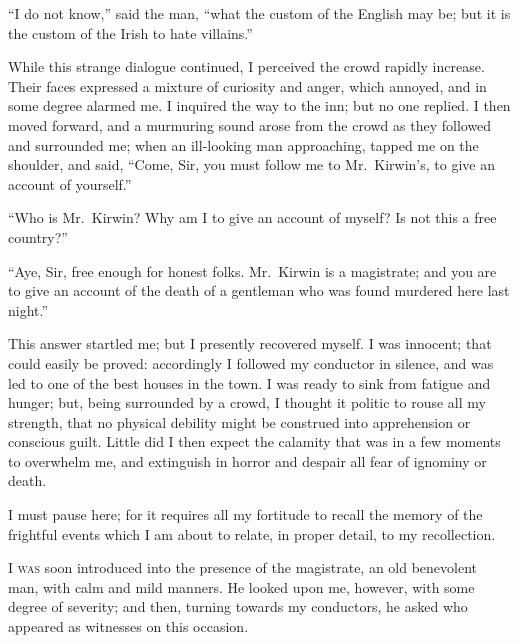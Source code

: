``I do not know,'' said the man,
``what the custom of the English may
be; but it is the custom of the Irish to
hate villains.''

While this strange dialogue continued,
I perceived the crowd rapidly
increase. Their faces expressed a mixture
of curiosity and anger, which annoyed,
and in some degree alarmed
me. I inquired the way to the inn;
but no one replied. I then moved forward,
and a murmuring sound arose
from the crowd as they followed and
surrounded me; when an ill-looking
man approaching, tapped me on the
shoulder, and said, ``Come, Sir, you
must follow me to Mr.~Kirwin's, to give
an account of yourself.''

``Who is Mr.~Kirwin? Why am I
to give an account of myself? Is not
this a free country?''

``Aye, Sir, free enough for honest
folks. Mr.~Kirwin is a magistrate;
and you are to give an account of the
death of a gentleman who was found
murdered here last night.''

This answer startled me; but I presently
recovered myself. I was innocent;
that could easily be proved: accordingly
I followed my conductor in
silence, and was led to one of the best
houses in the town. I was ready to
sink from fatigue and hunger; but,
being surrounded by a crowd, I thought
it politic to rouse all my strength, that
no physical debility might be construed
into apprehension or conscious guilt.
Little did I then expect the calamity
that was in a few moments to overwhelm
me, and extinguish in horror
and despair all fear of ignominy or
death.

I must pause here; for it requires all
my fortitude to recall the memory of
the frightful events which I am about
to relate, in proper detail, to my recollection.


\textsc{I was} soon introduced into the presence
of the magistrate, an old benevolent
man, with calm and mild manners.
He looked upon me, however, with
some degree of severity; and then,
turning towards my conductors, he
asked who appeared as witnesses on
this occasion.

